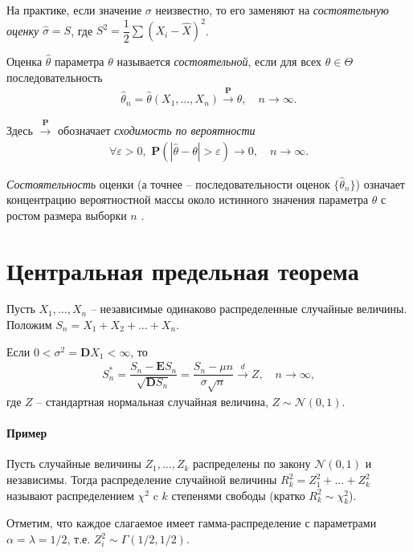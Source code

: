 \documentclass[%
	11pt,
	a4paper,
	utf8,
		]{article}
\begin{document}
На практике, если значение $ \sigma $ неизвестно, то его заменяют на \emph{состоятельную оценку} $ \hat{\sigma} = S $, где $ S^2 = \dfrac{1}{2}\sum (X_i - \hat{X})^2 $.

Оценка $ \hat{\theta} $ параметра $ \theta $ называется \emph{состоятельной}, если для всех $ \theta \in \Theta $ последовательность
\begin{align*}
	\hat{\theta}_n = \hat{\theta}(X_1, \dots, X_n) \xrightarrow{\mathbf{P}} \theta, \quad n \to \infty.
\end{align*}

Здесь $ \xrightarrow{\mathbf{P}} $ обозначает \emph{сходимость по вероятности}
\begin{align*}
	\forall \varepsilon > 0, \,\, \mathbf{P}( | \hat{\theta} - \theta | > \varepsilon ) \to 0, \quad n \to \infty.
\end{align*}

\emph{Состоятельность} оценки (а точнее -- последовательности оценок $ \{\hat{\theta}_n\} $) означает концентрацию вероятностной массы около истинного значения параметра $ \theta $ с ростом размера выборки $ n $ \cite[75]{lagutin:2009}.

\section{Центральная предельная теорема}

Пусть $ X_1,\dots, X_n $ -- независимые одинаково распределенные случайные величины. Положим $ S_n = X_1 + X_2 + \dots + X_n $.

Если $ 0 < \sigma^2 = \mathbf{D}X_1 < \infty $, то
\begin{align*}
	S^{*}_n = \dfrac{ S_n - \mathbf{E}S_n }{ \sqrt{\mathbf{D} S_n} } = \dfrac{S_n - \mu n}{\sigma \sqrt{n}} \xrightarrow{d} Z, \quad n \to \infty,
\end{align*}
где $ Z $ -- стандартная нормальная случайная величина, $ Z \sim \mathcal{N}(0, 1) $.

\paragraph{Пример} Пусть случайные величины $ Z_1, \dots, Z_k $ распределены по закону $ \mathcal{N}(0, 1) $ и независимы. Тогда распределение случайной величины $ R^2_k = Z_1^2 + \dots + Z_k^2 $ называют распределением $ \chi^2 $ c $ k $ степенями свободы (кратко $ R_k^2 \sim \chi_k^2 $).

Отметим, что каждое слагаемое имеет гамма-распределение с параметрами $ \alpha = \lambda = 1/2 $, т.е. $ Z_i^2 \sim \Gamma(1/2, 1/2) $. 
\end{document}
